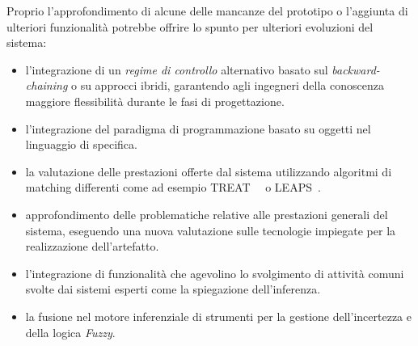 Proprio l'approfondimento di alcune delle mancanze del prototipo o l'aggiunta di ulteriori funzionalità potrebbe offrire lo spunto per ulteriori evoluzioni del sistema:
\begin{itemize}
	\item l'integrazione di un \emph{regime di controllo} alternativo basato sul \emph{backward-chaining} o su approcci ibridi, garantendo agli ingegneri della conoscenza maggiore flessibilità durante le fasi di progettazione.
	
	\item l'integrazione del paradigma di programmazione basato su oggetti nel linguaggio di specifica.
	
	\item la valutazione delle prestazioni offerte dal sistema utilizzando algoritmi di matching differenti come ad esempio TREAT~\cite{Miranker:1987:TBM:899610}~\cite{Miranker:1987:TBM:1856670.1856678} o LEAPS~\cite{Batory:1994:LA:899216}.	
	
	\item approfondimento delle problematiche relative alle prestazioni generali del sistema, eseguendo una nuova valutazione sulle tecnologie impiegate per la realizzazione dell'artefatto.
	
	\item l'integrazione di funzionalità che agevolino lo svolgimento di attività comuni svolte dai sistemi esperti come la spiegazione dell'inferenza.
	
	\item la fusione nel motore inferenziale di strumenti per la gestione dell'incertezza e della logica \emph{Fuzzy}.
\end{itemize}
